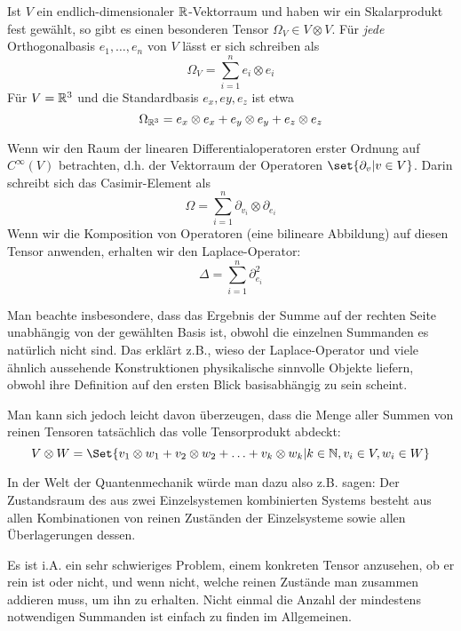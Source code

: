 \begin{example}\label{tensoren:casimir_element}
Ist $V$ ein endlich-dimensionaler $\mathbb{R}$-Vektorraum und haben wir ein Skalarprodukt fest gewählt, so gibt es einen besonderen Tensor $\Omega_V \in V\otimes V$. Für \textit{jede} Orthogonalbasis $e_1, \ldots, e_n$ von $V$ lässt er sich schreiben als
\[\Omega_V = \sum_{i=1}^n e_i \otimes e_i\]
Für $V=\mathbb{R}^3$ und die Standardbasis $e_x, ey, e_z$ ist etwa
\[\Omega_{\mathbb{R}^3} = e_x\otimes e_x + e_y\otimes e_y + e_z\otimes e_z\]

Wenn wir den Raum der linearen Differentialoperatoren erster Ordnung auf $C^\infty(V)$ betrachten, d.h. der Vektorraum der Operatoren $\set{\partial_v | v\in V}$. Darin schreibt sich das Casimir-Element als
\[\Omega = \sum_{i=1}^n \partial_{v_i} \otimes \partial_{e_i}\]
Wenn wir die Komposition von Operatoren (eine bilineare Abbildung) auf diesen Tensor anwenden, erhalten wir den Laplace-Operator:
\[\Delta = \sum_{i=1}^n \partial_{e_i}^2\]

Man beachte insbesondere, dass das Ergebnis der Summe auf der rechten Seite unabhängig von der gewählten Basis ist, obwohl die einzelnen Summanden es natürlich nicht sind. Das erklärt z.B., wieso der Laplace-Operator und viele ähnlich aussehende Konstruktionen physikalische sinnvolle Objekte liefern, obwohl ihre Definition auf den ersten Blick basisabhängig zu sein scheint.
\end{example}

\begin{remark}
Man kann sich jedoch leicht davon überzeugen, dass die Menge aller Summen von reinen Tensoren tatsächlich das volle Tensorprodukt abdeckt:
\[V\otimes W = \Set{v_1\otimes w_1 + v_2\otimes w_2 + \ldots + v_k\otimes w_k | k\in\IN, v_i\in V, w_i\in W}\]

In der Welt der Quantenmechanik würde man dazu also z.B. sagen: Der Zustandsraum des aus zwei Einzelsystemen kombinierten Systems besteht aus allen Kombinationen von reinen Zuständen der Einzelsysteme sowie allen Überlagerungen dessen.

Es ist i.A. ein sehr schwieriges Problem, einem konkreten Tensor anzusehen, ob er rein ist oder nicht, und wenn nicht, welche reinen Zustände man zusammen addieren muss, um ihn zu erhalten. Nicht einmal die Anzahl der mindestens notwendigen Summanden ist einfach zu finden im Allgemeinen.
\end{remark}

